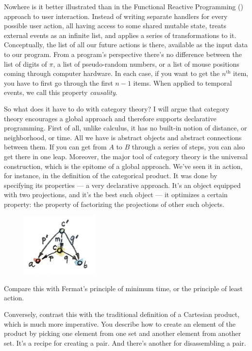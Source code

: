 Nowhere is it better illustrated than in the Functional Reactive
Programming () approach to user interaction. Instead of writing separate
handlers for every possible user action, all having access to some
shared mutable state,  treats external events as an infinite list,
and applies a series of transformations to it. Conceptually, the list of
all our future actions is there, available as the input data to our
program. From a program's perspective there's no difference between the
list of digits of $\pi$, a list of pseudo-random numbers, or a list of mouse
positions coming through computer hardware. In each case, if you want to
get the $n^\text{th}$ item, you have to first go through the first $n-1$ items. When
applied to temporal events, we call this property \emph{causality}.

So what does it have to do with category theory? I will argue that
category theory encourages a global approach and therefore supports
declarative programming. First of all, unlike calculus, it has no
built-in notion of distance, or neighborhood, or time. All we have is
abstract objects and abstract connections between them. If you can get
from $A$ to $B$ through a series of steps, you can also get there in one
leap. Moreover, the major tool of category theory is the universal
construction, which is the epitome of a global approach. We've seen it
in action, for instance, in the definition of the categorical product.
It was done by specifying its properties --- a very declarative
approach. It's an object equipped with two projections, and it's the
best such object --- it optimizes a certain property: the property of
factorizing the projections of other such objects.

\begin{figure}[H]
\centering
\includegraphics[width=0.35\textwidth]{images/productranking.jpg}
\end{figure}

\noindent
Compare this with Fermat's principle of minimum time, or the principle
of least action.

Conversely, contrast this with the traditional definition of a Cartesian
product, which is much more imperative. You describe how to create an
element of the product by picking one element from one set and another
element from another set. It's a recipe for creating a pair. And there's
another for disassembling a pair.

